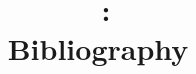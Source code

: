 \documentclass{article}
\begin{document}
\title{\lectype\ \lecfulltitle:\\Bibliography}

\author{\lecinstructor}

\date{\lecsemesterverb}

\maketitle

\makesessionbib
\end{document}
